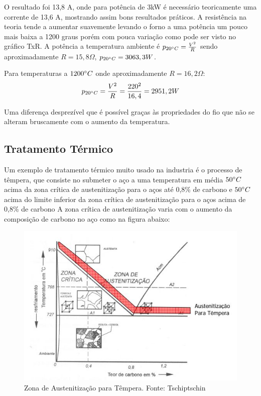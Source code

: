 O resultado foi 13,8 A, onde para potência de 3kW é necessário teoricamente uma corrente de 13,6 A, mostrando assim bons resultados práticos. A resistência na teoria tende a aumentar suavemente levando o forno a uma potência um pouco mais baixa a 1200 graus porém com pouca variação como pode ser visto no gráfico TxR. A potência a temperatura ambiente é $p_{20 \degree C} = \frac{V^{2}}{R}$ sendo aproximadamente $R = 15,8 \Omega$, $p_{20 \degree C} = 3063,3W$.

Para temperaturas a $1200\degree C$ onde aproximadamente $R = 16,2\Omega$:
\begin{gather}
    p_{20 \degree C} = \frac{V^{2}}{R} = \frac{220^{2}}{16,4} = 2951,2W
\end{gather}

Uma diferença desprezível que é possível graças às propriedades do fio que não se alteram bruscamente com o aumento da temperatura.

\subsection{Tratamento Térmico}
Um exemplo de tratamento térmico muito usado na industria é o processo de têmpera, que consiste no submeter o aço a uma temperatura em média $50 \degree C$ acima da zona crítica de austenitização para o aços até 0,8\% de carbono e $50 \degree C$ acima do limite inferior da zona crítica de austenitização para o aços acima de 0,8\% de carbono A zona crítica de austenitização varia com o aumento da composição de carbono no aço como na figura abaixo:
\begin{figure}[H]
	\centering
	\label{austenitizacao}
	\includegraphics[keepaspectratio=true,scale=0.7]{figuras/austenitizacao.JPG}
	\caption{Zona de Austenitização para Têmpera. Fonte: Tschiptschin}
\end{figure}

